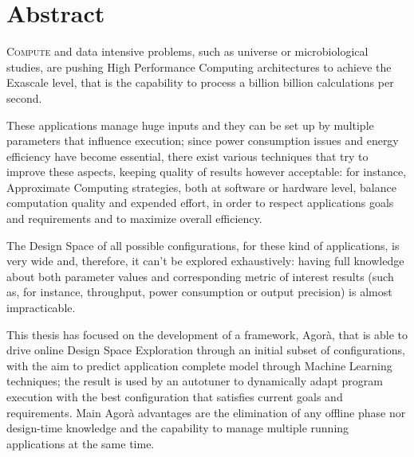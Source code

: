 \chapter*{Abstract}

\lettrine{C}{ompute} and data intensive problems, such as universe or microbiological studies, are pushing High Performance Computing architectures to achieve the Exascale level, that is the capability to process a billion billion calculations per second.

These applications manage huge inputs and they can be set up by multiple parameters that influence execution; since power consumption issues and energy efficiency have become essential, there exist various techniques that try to improve these aspects, keeping quality of results however acceptable: for instance, Approximate Computing strategies, both at software or hardware level, balance computation quality and expended effort, in order to respect applications goals and requirements and to maximize overall efficiency.

The Design Space of all possible configurations, for these kind of applications, is very wide and, therefore, it can't be explored exhaustively: having full knowledge about both parameter values and corresponding metric of interest results (such as, for instance, throughput, power consumption or output precision) is almost impracticable.

This thesis has focused on the development of a framework, Agorà, that is able to drive online Design Space Exploration through an initial subset of configurations, with the aim to predict application complete model through Machine Learning techniques; the result is used by an autotuner to dynamically adapt program execution with the best configuration that satisfies current goals and requirements. Main Agorà advantages are the elimination of any offline phase nor design-time knowledge and the capability to manage multiple running applications at the same time.
